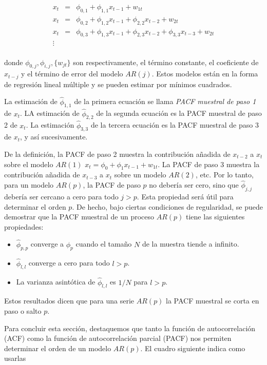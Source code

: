 \documentclass[12pt,]{krantz}
\theoremstyle{definition}
\theoremstyle{definition}
\theoremstyle{definition}
\theoremstyle{remark}
\begin{document}
\begin{eqnarray*}
x_t &=& \phi_{0,1}+\phi_{1,1}x_{t-1}+w_{1t} \\
x_t &=& \phi_{0,2}+\phi_{1,2}x_{t-1}+\phi_{2,2}x_{t-2}+w_{2t} \\
x_t &=& \phi_{0,3}+\phi_{1,3}x_{t-1}+\phi_{2,3}x_{t-2}+\phi_{3,3}x_{t-3}+w_{2t} \\
\vdots & & \\
\end{eqnarray*}

donde \(\phi_{0,j}, \phi_{i,j}, \{w_{jt}\}\) son respectivamente, el
término constante, el coeficiente de \(x_{t-j}\) y el término de error
del modelo \(AR(j)\). Estos modelos están en la forma de regresión
lineal múltiple y se pueden estimar por mínimos cuadrados.

La estimación de \(\hat{\phi}_{1,1}\) de la primera ecuación se llama
\emph{PACF muestral de paso 1} de \(x_t\). LA estimación de
\(\hat{\phi}_{2,2}\) de la segunda ecuación es la PACF muestral de paso
2 de \(x_t\). La estimación \(\hat{\phi}_{3,3}\) de la tercera ecuación
es la PACF muestral de paso 3 de \(x_t\), y así sucesivamente.

De la definición, la PACF de paso 2 muestra la contribución añadida de
\(x_{t-2}\) a \(x_t\) sobre el modelo \(AR(1)\)
\(x_t=\phi_0+\phi_1x_{t-1}+w_{1t}\). La PACF de paso 3 muestra la
contribución añadida de \(x_{t-3}\) a \(x_t\) sobre un modelo \(AR(2)\),
etc. Por lo tanto, para un modelo \(AR(p)\), la PACF de paso \(p\) no
debería ser cero, sino que \(\hat{\phi}_{j,j}\) debería ser cercano a
cero para todo \(j>p\). Esta propiedad será útil para determinar el
orden \(p\). De hecho, bajo ciertas condiciones de regularidad, se puede
demostrar que la PACF muestral de un proceso \(AR(p)\) tiene las
siguientes propiedades:

\begin{itemize}
\item
  \(\hat{\phi}_{p,p}\) converge a \(\phi_p\) cuando el tamaño \(N\) de
  la muestra tiende a infinito.
\item
  \(\hat{\phi}_{l,l}\) converge a cero para todo \(l>p\).
\item
  La varianza asintótica de \(\hat{\phi}_{l,l}\) es \(1/N\) para
  \(l>p\).
\end{itemize}

Estos resultados dicen que para una serie \(AR(p)\) la PACF muestral se
corta en paso o salto \(p\).

Para concluir esta sección, destaquemos que tanto la función de
autocorrelación (ACF) como la función de autocorrelación parcial (PACF)
nos permiten determinar el orden de un modelo \(AR(p)\). El cuadro
siguiente indica como usarlas
\end{document}
